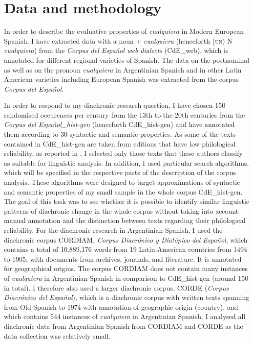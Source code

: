 \section{Data and methodology} \label{sec:1.5}

In order to describe the evaluative properties of \textit{cualquiera} in Modern European Spanish, I have extracted data with a noun + \textit{cualquiera} (henceforth (\textsc{un)} N \textit{cualquiera}) from the \textit{Corpus del Español web dialects} (CdE\_web), which is annotated for different regional varieties of Spanish. The data on the postnominal as well as on the pronoun \textit{cualquiera} in Argentinian Spanish and in other Latin American varieties including European Spanish was extracted from the corpus \textit{Corpus del Español}. 

In order to respond to my diachronic research question, I have chosen 150 randomised occurences per century from the 13th to the 20th centuries from the \textit{Corpus del Español\_hist-gen} (henceforth CdE\_hist-gen) and have annotated them according to 30 syntactic and semantic properties. As some of the texts contained in CdE\_hist-gen are taken from editions that have low philological reliability, as reported in \citet{OctaviodeToledo2017}, I selected only those texts that these authors classify as suitable for linguistic analysis. {In addition, I used particular search algorithms, which will be specified in the respective parts of the description of the corpus analysis. These algorithms were designed to target approximations of syntactic and semantic properties of my small sample in the whole corpus CdE\_hist-gen. The goal of this task was to see whether it is possible to identify similar linguistic patterns of diachronic change in the whole corpus without taking into account manual annotation and the distinction between texts regarding their philological reliability.} For the diachronic research in Argentinian Spanish, I used the diachronic corpus CORDIAM, \textit{Corpus Diacrónico y Diatópico del Español}, which contains a total of 10,889,176 words from 19 Latin-American countries from 1494 to 1905, with documents from archives, journals, and literature. It is annotated for geographical origins. The corpus CORDIAM does not contain many instances of \textit{cualquiera} in Argentinian Spanish in comparison to CdE\_hist-gen (around 150 in total). I therefore also used a larger diachronic corpus, CORDE (\textit{Corpus Diacrónico del Español}), which is a diachronic corpus with written texts spanning from Old Spanish to 1974 with annotation of geographic origin (country), and which contains 544 instances of \textit{cualquiera} in Argentinian Spanish. I analysed all diachronic data from Argentinian Spanish from CORDIAM and CORDE as the data collection was relatively small.

